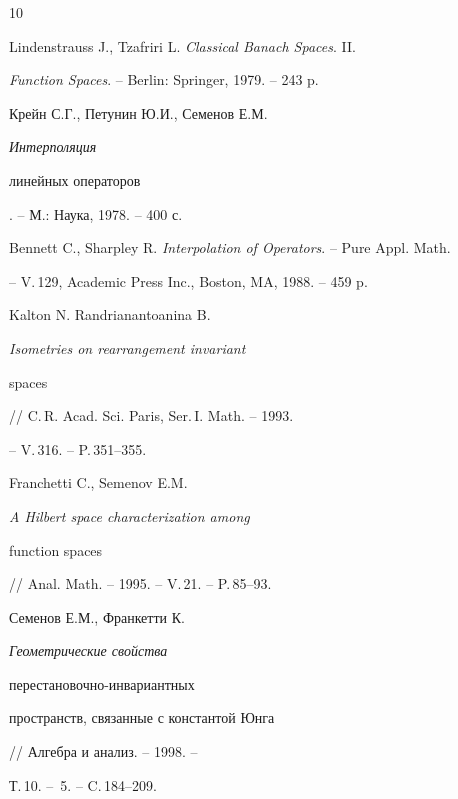\begin{thebibliography}{10}







Lindenstrauss J., Tzafriri L. {\em Classical Banach Spaces}. II.


{\em Function Spaces}. -- Berlin: Springer, 1979. -- 243 p.







Крейн С.Г., Петунин Ю.И., Семенов Е.М. {\em Интерполяция


линейных операторов}. -- М.: Наука, 1978. -- 400 с.







Bennett C., Sharpley R. {\em Interpolation of Operators}. -- Pure Appl. Math. 


-- V.\,129, Academic Press Inc., Boston, MA, 1988. -- 459 p.







Kalton N. Randrianantoanina B. {\em Isometries on rearrangement invariant 


spaces} // C.\,R. Acad. Sci. Paris, Ser.\,I. Math. -- 1993.


-- V.\,316. -- P.\,351--355.







Franchetti C., Semenov E.M. {\em A Hilbert space characterization among 


function spaces} // Anal. Math. -- 1995. -- V.\,21. -- P.\,85--93. 







Семенов Е.М., Франкетти К. {\em Геометрические свойства 


перестановочно-инвариантных


пространств, связанные с константой Юнга} // Алгебра и анализ. -- 1998. -- 


Т.\,10. -- \No\,5. -- C.\,184--209.





\end{thebibliography}





